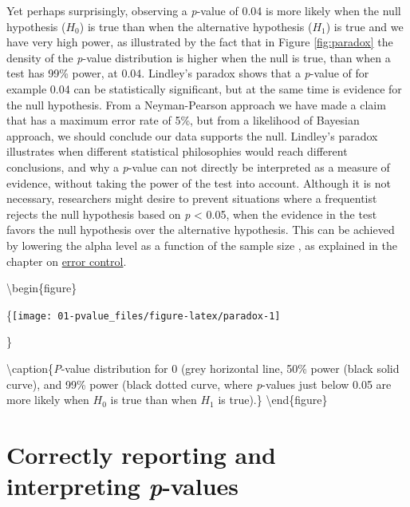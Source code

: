 \documentclass[
  oneside]{book}
\begin{document}
Yet perhaps surprisingly, observing a \emph{p}-value of 0.04 is more likely when the null hypothesis (\(H_0\)) is true than when the alternative hypothesis (\(H_1\)) is true and we have very high power, as illustrated by the fact that in Figure \ref{fig:paradox} the density of the \emph{p}-value distribution is higher when the null is true, than when a test has 99\% power, at 0.04. Lindley's paradox shows that a \emph{p}-value of for example 0.04 can be statistically significant, but at the same time is evidence for the null hypothesis. From a Neyman-Pearson approach we have made a claim that has a maximum error rate of 5\%, but from a likelihood of Bayesian approach, we should conclude our data supports the null. Lindley's paradox illustrates when different statistical philosophies would reach different conclusions, and why a \emph{p}-value can not directly be interpreted as a measure of evidence, without taking the power of the test into account. Although it is not necessary, researchers might desire to prevent situations where a frequentist rejects the null hypothesis based on \emph{p} \textless{} 0.05, when the evidence in the test favors the null hypothesis over the alternative hypothesis. This can be achieved by lowering the alpha level as a function of the sample size \citep{leamer_specification_1978, maier_justify_2022, good_bayesnon-bayes_1992}, as explained in the chapter on \protect\hyperlink{errorcontrol}{error control}.

\textbackslash begin\{figure\}

\{\centering \texttt{[image: 01-pvalue\_files/figure-latex/paradox-1]}

\}

\textbackslash caption\{\emph{P}-value distribution for 0 (grey horizontal line, 50\% power (black solid curve), and 99\% power (black dotted curve, where \emph{p}-values just below 0.05 are more likely when \(H_0\) is true than when \(H_1\) is true).\}\label{fig:paradox}
\textbackslash end\{figure\}

\hypertarget{correctly-reporting-and-interpreting-p-values}{%
\section{\texorpdfstring{Correctly reporting and interpreting \emph{p}-values}{Correctly reporting and interpreting p-values}}\label{correctly-reporting-and-interpreting-p-values}}
\end{document}
